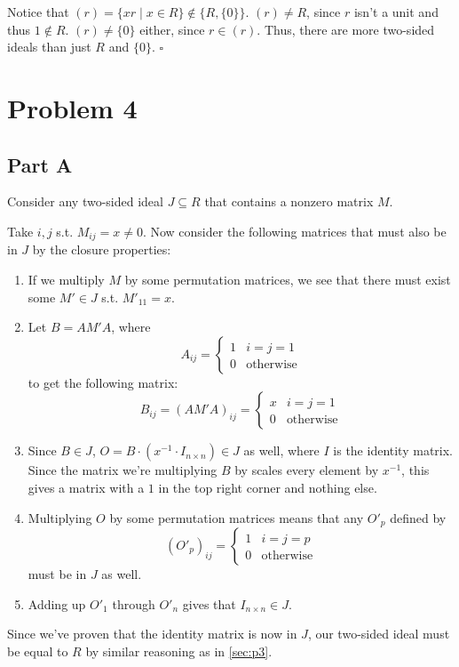 \documentclass[12pt]{article}
\begin{document}
Notice that $(r)=\{xr \mid x \in R\} \notin \{R, \{0\}\}$.
$(r) \ne R$, since $r$ isn't a unit and thus $1 \notin R$.
$(r) \ne \{0\}$ either, since $r \in (r)$.
Thus, there are more two-sided ideals than just $R$ and $\{0\}$. $\square$

\pagebreak

\section{Problem 4}

\subsection{Part A}

Consider any two-sided ideal $J \subseteq R$ that contains a nonzero matrix $M$.

Take $i, j$ s.t. $M_{ij} = x \ne 0$.
Now consider the following matrices that must also be in $J$ by the closure properties:
\begin{enumerate}
    \item If we multiply $M$ by some permutation matrices, we see that
            there must exist some $M' \in J$ s.t. $M'_{11}=x$.

    \item Let $B=AM'A$, where
            \[A_{ij}=\begin{cases}
                    1 & i=j=1            \\
                    0 & \text{otherwise}
                \end{cases}\]
            to get the following matrix:
            \[B_{ij}=(AM'A)_{ij}=\begin{cases}
                    x & i=j=1            \\
                    0 & \text{otherwise}
                \end{cases}\]
    
    \item Since $B \in J$, $O=B \cdot \left(x^{-1} \cdot I_{n \times n}\right) \in J$ as well,
    where $I$ is the identity matrix.
    Since the matrix we're multiplying $B$ by scales every element by $x^{-1}$,
    this gives a matrix with a $1$ in the top right corner and nothing else.

    \item Multiplying $O$ by some permutation matrices means that any $O'_p$ defined by
    \[(O'_p)_{ij}=\begin{cases}
        1 & i=j=p \\
        0 & \text{otherwise}
    \end{cases}\]
    must be in $J$ as well.
    
    \item Adding up $O'_1$ through $O'_n$ gives that $I_{n \times n} \in J$.
\end{enumerate}
Since we've proven that the identity matrix is now in $J$, our two-sided
ideal must be equal to $R$ by similar reasoning as in \ref{sec:p3}.
\end{document}
